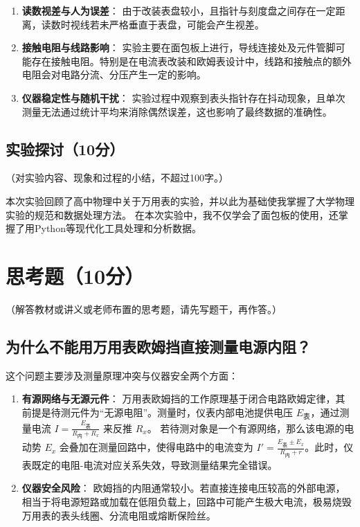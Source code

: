 \documentclass{../../templates/Report}%
\begin{document}
\begin{fullreportonly}
\begin{enumerate}
        \item \textbf{读数视差与人为误差}：
              由于改装表盘较小，且指针与刻度盘之间存在一定距离，读数时视线若未严格垂直于表盘，可能会产生视差。

        \item \textbf{接触电阻与线路影响}：
              实验主要在面包板上进行，导线连接处及元件管脚可能存在接触电阻。特别是在电流表改装和欧姆表设计中，线路和接触点的额外电阻会对电路分流、分压产生一定的影响。

        \item \textbf{仪器稳定性与随机干扰}：
              实验过程中观察到表头指针存在抖动现象，且单次测量无法通过统计平均来消除偶然误差，这也影响了最终数据的准确性。
    \end{enumerate}
    \subsection{实验探讨（10分）}
    （对实验内容、现象和过程的小结，不超过100字。）


    本次实验回顾了高中物理中关于万用表的实验，并以此为基础使我掌握了大学物理实验的规范和数据处理方法。
    在本次实验中，我不仅学会了面包板的使用，还掌握了用Python等现代化工具处理和分析数据。

    \section{思考题（10分）}
    （解答教材或讲义或老师布置的思考题，请先写题干，再作答。）

    \subsection{为什么不能用万用表欧姆挡直接测量电源内阻？}
    这个问题主要涉及测量原理冲突与仪器安全两个方面：
    \begin{enumerate}
        \item \textbf{有源网络与无源元件}：
              万用表欧姆挡的工作原理基于闭合电路欧姆定律，其前提是待测元件为“无源电阻”。测量时，仪表内部电池提供电压 $E_{\text{表}}$，通过测量电流 $I = \frac{E_{\text{表}}}{R_{\text{内}} + R_x}$ 来反推 $R_x$。
              若待测对象是一个有源网络，那么该电源的电动势 $E_x$ 会叠加在测量回路中，使得电路中的电流变为 $I' = \frac{E_{\text{表}} \pm E_x}{R_{\text{内}} + r}$。此时，仪表既定的电阻-电流对应关系失效，导致测量结果完全错误。

        \item \textbf{仪器安全风险}：
              欧姆挡的内阻通常较小。若直接连接电压较高的外部电源，相当于将电源短路或加载在低阻负载上，回路中可能产生极大电流，极易烧毁万用表的表头线圈、分流电阻或熔断保险丝。
    \end{enumerate}


\end{fullreportonly}
\end{document}

